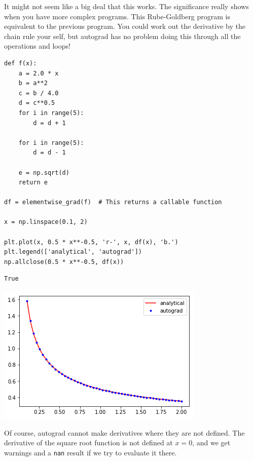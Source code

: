 \documentclass[11pt]{article}
\begin{document}
It might not seem like a big deal that this works. The significance really shows when you have more complex programs. This Rube-Goldberg program is equivalent to the previous program. You could work out the derivative by the chain rule your self, but autograd has no problem doing this through all the operations and loops!

\begin{verbatim}
def f(x):
    a = 2.0 * x
    b = a**2
    c = b / 4.0
    d = c**0.5
    for i in range(5):
        d = d + 1

    for i in range(5):
        d = d - 1

    e = np.sqrt(d)
    return e

df = elementwise_grad(f)  # This returns a callable function

x = np.linspace(0.1, 2)

plt.plot(x, 0.5 * x**-0.5, 'r-', x, df(x), 'b.')
plt.legend(['analytical', 'autograd'])
np.allclose(0.5 * x**-0.5, df(x))
\end{verbatim}

\begin{verbatim}
True
\end{verbatim}



\begin{center}
\includegraphics[width=.9\linewidth]{obipy-resources/7b778712de6ec6a237e88377d645bb2e-783864Du.png}
\end{center}

Of course, autograd cannot make derivatives where they are not defined. The derivative of the square root function is not defined at \(x=0\), and we get warnings and a \texttt{nan} result if we try to evaluate it there.
\end{document}
